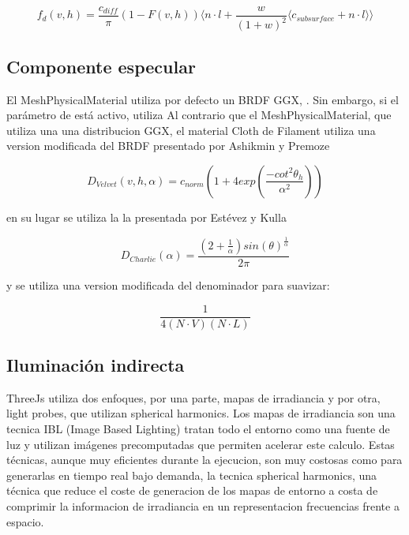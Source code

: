   \begin{equation}
  f_d(v, h) = \frac{c_{diff}}{\pi}(1 - F(v, h))
  \Bigg\langle
  n\cdot{l} + \frac{w}{(1+ w)^2}\langle c_{subsurface} + n \cdot{l} \rangle
  \Bigg\rangle
  \end{equation}
  \singlespacing

  \subsection{Componente especular}

  El MeshPhysicalMaterial utiliza por defecto un BRDF GGX, \autocite{ggx}. Sin embargo, si el par\'ametro de 
  est\'a activo, utiliza 
  Al contrario que el MeshPhysicalMaterial, que utiliza una una distribucion GGX, el material
  Cloth de Filament utiliza una  version modificada del BRDF presentado por Ashikmin y Premoze
  \autocite{velvet}

  \begin{equation}
  D_{Velvet}(v, h, \alpha) = c_{norm} (
    1 + 4exp \left(\frac{-cot^2\theta_h}{\alpha^2}\right)
  )
  \end{equation}
  \singlespacing

  en su lugar se utiliza la la presentada por Est\'evez y Kulla \autocite{sheen}

  \begin{equation}
    D_{Charlie}(\alpha) = \frac
      {(2 + \frac{1}{\alpha})sin(\theta)^\frac{1}{\alpha}}
      {2\pi}
  \end{equation}
  \singlespacing

  y se utiliza una version modificada del denominador para suavizar:

  \begin{equation}
  \frac{1}{4(N\cdot{V})(N\cdot{L})}
  \end{equation}
  \singlespacing

  \subsection{Iluminaci\'on indirecta}
    ThreeJs utiliza dos enfoques, por una parte, mapas de irradiancia y por otra, light probes, que
    utilizan spherical harmonics. Los mapas de irradiancia son una tecnica IBL (Image Based Lighting)
    tratan todo el entorno como una fuente de luz y utilizan im\'agenes precomputadas que permiten
    acelerar este calculo. Estas t\'ecnicas, aunque muy eficientes durante la ejecucion, son muy
    costosas como para generarlas en tiempo real bajo demanda, la tecnica spherical harmonics, una
    t\'ecnica que reduce el coste de generacion de los mapas de entorno a costa de comprimir la
    informacion de irradiancia en un representacion frecuencias frente a espacio.

